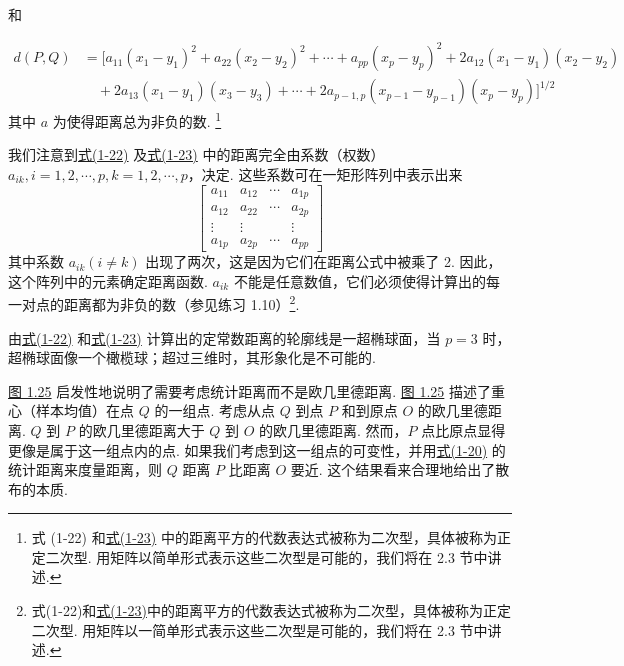 
和

\label{eq:1-23}
\begin{equation}
\begin{aligned}
d(P, Q) &= [a_{11}(x_1 - y_1)^2 + a_{22}(x_2 - y_2)^2 + \cdots + a_{pp}(x_p - y_p)^2 + 2a_{12}(x_1 - y_1)(x_2 - y_2) \\
&\quad + 2a_{13}(x_1 - y_1)(x_3 - y_3) + \cdots + 2a_{p-1,p}(x_{p-1} - y_{p-1})(x_p - y_p)]^{1/2}
\end{aligned} \tag{1-23}
\end{equation}
其中 $a$ 为使得距离总为非负的数. \footnote{式 (1-22) 和\hyperref[eq:1-23]{式(1-23)} 中的距离平方的代数表达式被称为二次型，具体被称为正定二次型. 用矩阵以简单形式表示这些二次型是可能的，我们将在 2.3 节中讲述.}

我们注意到\hyperref[eq:1-22]{式(1-22)} 及\hyperref[eq:1-23]{式(1-23)} 中的距离完全由系数（权数）$a_{ik}, i = 1, 2, \cdots, p, k = 1, 2, \cdots, p$，决定. 这些系数可在一矩形阵列中表示出来
\label{eq:1-24}
\begin{equation}
\begin{bmatrix}
a_{11} & a_{12} & \cdots & a_{1p} \\
a_{12} & a_{22} & \cdots & a_{2p} \\
\vdots & \vdots & & \vdots \\
a_{1p} & a_{2p} & \cdots & a_{pp}
\end{bmatrix} \tag{1-24}
\end{equation}
其中系数 $a_{ik} (i \neq k)$ 出现了两次，这是因为它们在距离公式中被乘了 2. 因此，这个阵列中的元素确定距离函数. $a_{ik}$ 不能是任意数值，它们必须使得计算出的每一对点的距离都为非负的数（参见练习 1.10）\footnote{式(1-22)和\hyperref[eq:1-23]{式(1-23)}中的距离平方的代数表达式被称为二次型，具体被称为正定二次型. 用矩阵以一简单形式表示这些二次型是可能的，我们将在 2.3 节中讲述.}.

由\hyperref[eq:1-22]{式(1-22)} 和\hyperref[eq:1-23]{式(1-23)} 计算出的定常数距离的轮廓线是一超椭球面，当 $p = 3$ 时，超椭球面像一个橄榄球；超过三维时，其形象化是不可能的.

\begin{mvfigure}
\label{fig:1.25}
\end{mvfigure}

\hyperref[fig:1.25]{图 1.25} 启发性地说明了需要考虑统计距离而不是欧几里德距离. \hyperref[fig:1.25]{图 1.25} 描述了重心（样本均值）在点 $Q$ 的一组点. 考虑从点 $Q$ 到点 $P$ 和到原点 $O$ 的欧几里德距离. $Q$ 到 $P$ 的欧几里德距离大于 $Q$ 到 $O$ 的欧几里德距离. 然而，$P$ 点比原点显得更像是属于这一组点内的点. 如果我们考虑到这一组点的可变性，并用\hyperref[eq:1-20]{式(1-20)} 的统计距离来度量距离，则 $Q$ 距离 $P$ 比距离 $O$ 要近. 这个结果看来合理地给出了散布的本质.

